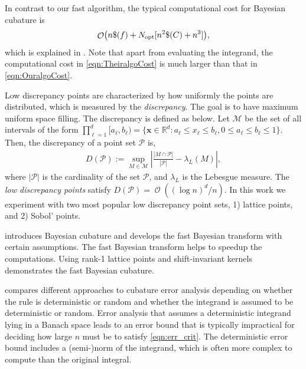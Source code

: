 \documentclass{svjour3}                     %
\DeclareMathOperator{\Order}{{\mathcal O}}
\newcommand{\bm}[1]{\boldsymbol{#1}}
\newcommand{\vx}{\bm{x}}
\newcommand{\opt}{{\textup{opt}}}
\def\abs#1{\ensuremath{\left \lvert #1 \right \rvert}}
\begin{document}
In contrast to our fast algorithm, the typical computational cost for Bayesian cubature is
\begin{equation} \label{eqn:TheiralgoCost}
\Order\bigl(n \$(f) + N_{\opt}[n^2\$(C) + n^3] \bigr),
\end{equation} 
which is explained in \cite{JagHic19a}. Note that apart from evaluating the integrand, the computational cost in \eqref{eqn:TheiralgoCost} is much larger than that in \eqref{eqn:OuralgoCost}.  




Low discrepancy points are characterized by how uniformly the points are distributed, which is measured by the \emph{discrepancy}. %
The goal is to have maximum uniform space filling. The discrepancy is defined as below.
Let $\mathcal{M}$ be the set of all intervals of the form $\prod_{\ell=1}^{d} [a_\ell, b_\ell) = \{ \vx \in \mathbb{R}^d : a_\ell \le x_\ell \le b_\ell, 0 \le a_\ell \le b_\ell \le 1 \}$. Then, the discrepancy of a point set $\mathcal{P}$ is,
\begin{align*}
D(\mathcal{P}) := \sup_{M \in \mathcal{M}} 
\abs{ \frac{\abs{M \cap \mathcal{P}}}{\abs{\mathcal{P}}} - \lambda_L(M) },
\end{align*}
where $\abs{\mathcal{P}}$ is the cardinality of the set $\mathcal{P}$, and $\lambda_L$ is the Lebesgue measure.
The \emph{low discrepancy points} satisfy $D(\mathcal{P}) = \Order((\log n)^d/n)$.
In this work we experiment with two most popular low discrepancy point sets, 1) lattice points, and 2) Sobol' points.
\fi


\cite{JagHic19a} introduces Bayesian cubature and develops the fast Bayesian transform with certain assumptions. The fast Bayesian transform helps to speedup the computations.  Using rank-1 lattice points and shift-invariant kernels demonstrates the fast Bayesian cubature. 


\cite{Hic17a} compares different approaches to cubature error analysis depending on whether the rule is deterministic or random and whether the integrand is assumed to be deterministic or random.  Error analysis that assumes a deterministic integrand lying in a Banach space leads to an error bound that is typically impractical for deciding how large $n$ must be to satisfy \eqref{eqn:err_crit}.  The deterministic error bound includes a (semi-)norm of the integrand, which is often more complex to compute than the original integral.
\end{document}
